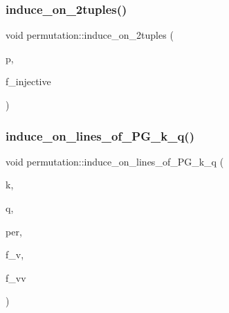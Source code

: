 \subsubsection{\texorpdfstring{induce\+\_\+on\+\_\+2tuples()}{induce\_on\_2tuples()}}
{\footnotesize\ttfamily void permutation\+::induce\+\_\+on\+\_\+2tuples (\begin{DoxyParamCaption}\item[{\mbox{\hyperlink{classpermutation}{permutation}} \&}]{p,  }\item[{\mbox{\hyperlink{galois_8h_a09fddde158a3a20bd2dcadb609de11dc}{I\+NT}}}]{f\+\_\+injective }\end{DoxyParamCaption})}

\mbox{\label{classpermutation_a3e01585ffb15282fc45a3158c5ad0b76}} 
\subsubsection{\texorpdfstring{induce\+\_\+on\+\_\+lines\+\_\+of\+\_\+\+P\+G\+\_\+k\+\_\+q()}{induce\_on\_lines\_of\_PG\_k\_q()}}
{\footnotesize\ttfamily void permutation\+::induce\+\_\+on\+\_\+lines\+\_\+of\+\_\+\+P\+G\+\_\+k\+\_\+q (\begin{DoxyParamCaption}\item[{\mbox{\hyperlink{galois_8h_a09fddde158a3a20bd2dcadb609de11dc}{I\+NT}}}]{k,  }\item[{\mbox{\hyperlink{galois_8h_a09fddde158a3a20bd2dcadb609de11dc}{I\+NT}}}]{q,  }\item[{\mbox{\hyperlink{classpermutation}{permutation}} \&}]{per,  }\item[{\mbox{\hyperlink{galois_8h_a09fddde158a3a20bd2dcadb609de11dc}{I\+NT}}}]{f\+\_\+v,  }\item[{\mbox{\hyperlink{galois_8h_a09fddde158a3a20bd2dcadb609de11dc}{I\+NT}}}]{f\+\_\+vv }\end{DoxyParamCaption})}

\mbox{\label{classpermutation_a1209ecbc8fdb0320a38218bd0c15c5fa}} 
